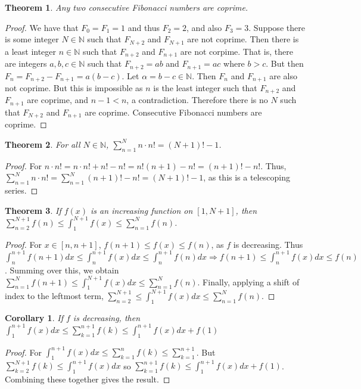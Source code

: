 \documentclass[oneside]{book}
\theoremstyle{mystyle}
\newtheorem{theorem}{Theorem}[section]
\newtheorem{corollary}{Corollary}[section]
\begin{document}
\begin{theorem}
Any two consecutive Fibonacci numbers are coprime.
\end{theorem}
\begin{proof}
We have that $F_0=F_1 = 1$ and thus $F_2 = 2$, and also $F_3 = 3$. Suppose there is some integer $N\in \mathbb{N}$ such that $F_{N+2}$ and $F_{N+1}$ are not coprime. Then there is a least integer $n\in \mathbb{N}$ such that $F_{n+2}$ and $F_{n+1}$ are not corpime. That is, there are integers $a,b,c\in \mathbb{N}$ such that $F_{n+2} = ab$ and $F_{n+1} = ac$ where $b>c$. But then $F_{n} = F_{n+2} - F_{n+1} = a(b-c)$. Let $\alpha = b-c \in \mathbb{N}$. Then $F_n$ and $F_{n+1}$ are also not coprime. But this is impossible as $n$ is the least integer such that $F_{n+2}$ and $F_{n+1}$ are coprime, and $n-1<n$, a contradiction. Therefore there is no $N$ such that $F_{N+2}$ and $F_{n+1}$ are coprime. Consecutive Fibonacci numbers are coprime. 
\end{proof}

\begin{theorem}
For all $N\in \mathbb{N}$, $\sum_{n=1}^{N} n\cdot n! = (N+1)!-1$.
\end{theorem}
\begin{proof}
For $n\cdot n! = n\cdot n! + n! - n! = n!(n+1) - n!=(n+1)!-n!$. Thus, $\sum_{n=1}^{N} n\cdot n! = \sum_{n=1}^{N} (n+1)! -n! = (N+1)!-1$, as this is a telescoping series.
\end{proof}

\begin{theorem}
If $f(x)$ is an increasing function on $[1,N+1]$, then $\sum_{n=2}^{N+1} f(n) \leq \int_{1}^{N+1} f(x) \leq \sum_{n=1}^{N} f(n)$.
\end{theorem}
\begin{proof}
For $x\in [n,n+1]$, $f(n+1)\leq f(x)\leq f(n)$, as $f$ is decreasing. Thus $\int_{n}^{n+1} f(n+1)dx \leq \int_{n}^{n+1} f(x) dx \leq \int_{n}^{n+1} f(n)dx \Rightarrow f(n+1) \leq \int_{n}^{n+1}f(x)dx \leq f(n)$. Summing over this, we obtain $\sum_{n=1}^{N} f(n+1) \leq \int_{1}^{N+1} f(x) dx \leq \sum_{n=1}^{N} f(n)$. Finally, applying a shift of index to the leftmost term, $\sum_{n=2}^{N+1} \leq \int_{1}^{N+1}f(x)dx \leq \sum_{n=1}^{N} f(n)$. 
\end{proof}

\begin{corollary}
If $f$ is decreasing, then $\int_{1}^{n+1} f(x)dx \leq \sum_{k=1}^{n+1} f(k) \leq \int_{1}^{n+1} f(x)dx + f(1)$
\end{corollary}
\begin{proof}
For $\int_{1}^{n+1}f(x) dx \leq \sum_{k=1}^{n}f(k)\leq \sum_{k=1}^{n+1}$. But $\sum_{k=2}^{N+1} f(k) \leq \int_{1}^{n+1}f(x)dx$ so $\sum_{k=1}^{n+1}f(k) \leq \int_{1}^{n+1}f(x)dx +f(1)$. Combining these together gives the result.
\end{proof}
\end{document}
